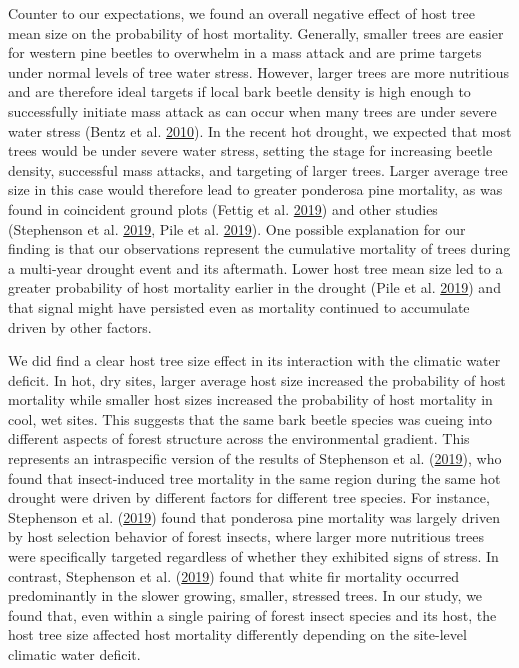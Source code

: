 \documentclass[twoside,12pt,final]{ucthesis-CA2012}
\begin{document}
\begin{ucmainmatter}
Counter to our expectations, we found an overall negative effect of host
tree mean size on the probability of host mortality. Generally, smaller
trees are easier for western pine beetles to overwhelm in a mass attack
and are prime targets under normal levels of tree water stress. However,
larger trees are more nutritious and are therefore ideal targets if
local bark beetle density is high enough to successfully initiate mass
attack as can occur when many trees are under severe water stress (Bentz
et al. \protect\hyperlink{ref-bentz2010}{2010}). In the recent hot
drought, we expected that most trees would be under severe water stress,
setting the stage for increasing beetle density, successful mass
attacks, and targeting of larger trees. Larger average tree size in this
case would therefore lead to greater ponderosa pine mortality, as was
found in coincident ground plots (Fettig et al.
\protect\hyperlink{ref-fettig2019}{2019}) and other studies (Stephenson
et al. \protect\hyperlink{ref-stephenson2019}{2019}, Pile et al.
\protect\hyperlink{ref-pile2019}{2019}). One possible explanation for
our finding is that our observations represent the cumulative mortality
of trees during a multi-year drought event and its aftermath. Lower host
tree mean size led to a greater probability of host mortality earlier in
the drought (Pile et al. \protect\hyperlink{ref-pile2019}{2019}) and
that signal might have persisted even as mortality continued to
accumulate driven by other factors.

We did find a clear host tree size effect in its interaction with the
climatic water deficit. In hot, dry sites, larger average host size
increased the probability of host mortality while smaller host sizes
increased the probability of host mortality in cool, wet sites. This
suggests that the same bark beetle species was cueing into different
aspects of forest structure across the environmental gradient. This
represents an intraspecific version of the results of Stephenson et al.
(\protect\hyperlink{ref-stephenson2019}{2019}), who found that
insect-induced tree mortality in the same region during the same hot
drought were driven by different factors for different tree species. For
instance, Stephenson et al.
(\protect\hyperlink{ref-stephenson2019}{2019}) found that ponderosa pine
mortality was largely driven by host selection behavior of forest
insects, where larger more nutritious trees were specifically targeted
regardless of whether they exhibited signs of stress. In contrast,
Stephenson et al. (\protect\hyperlink{ref-stephenson2019}{2019}) found
that white fir mortality occurred predominantly in the slower growing,
smaller, stressed trees. In our study, we found that, even within a
single pairing of forest insect species and its host, the host tree size
affected host mortality differently depending on the site-level climatic
water deficit.


\end{ucmainmatter}
\end{document}
